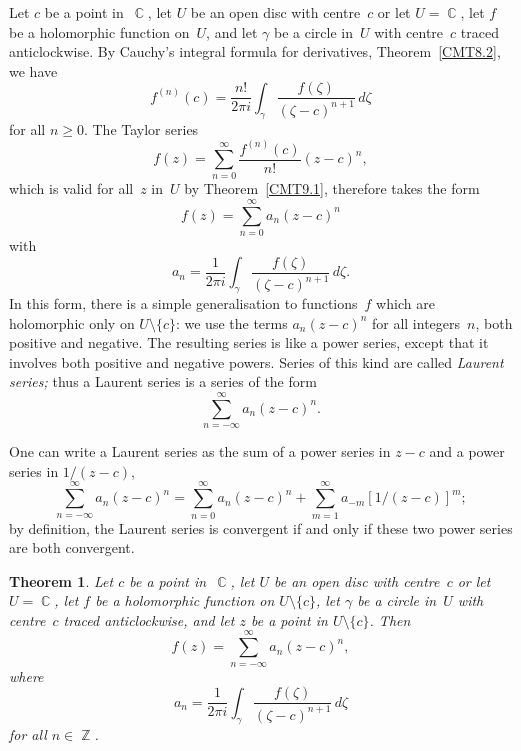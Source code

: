 \documentclass{amsproc}
\newtheorem{theorem}{Theorem}[subsection]
\theoremstyle{definition}
\theoremstyle{remark}
\DeclareMathOperator{\Z}{\mathbb{Z}}
\DeclareMathOperator{\C}{\mathbb{C}}
\numberwithin{equation}{section}
\begin{document}
Let $ c $ be a point in~$ \C $, let $ U $ be an open disc with centre~$ c $ or let $ U = \C $, let $ f $ be a holomorphic function on~$ U $, and let $ \gamma $ be a circle
in~$ U $ with centre~$ c $ traced anticlockwise. By Cauchy's integral formula for derivatives, Theorem~\ref{CMT8.2}, we have
$$
f^{(n)}(c) = \dfrac{n!}{2\pi i} \int_\gamma\dfrac{f(\zeta)}{(\zeta - c)^{n + 1}}\,d\zeta
$$
for all $ n \geq 0 $. The Taylor series
$$
f(z) = \sum_{n = 0}^\infty \dfrac{f^{(n)}(c)}{n!}(z - c)^n,
$$
which is valid for all~$ z $ in~$ U $ by Theorem~\ref{CMT9.1}, therefore takes the form
$$
f(z) = \sum_{n = 0}^\infty a_n(z - c)^n
$$
with
$$
a_n = \dfrac{1}{2\pi i} \int_\gamma\dfrac{f(\zeta)}{(\zeta - c)^{n + 1}}\,d\zeta.
$$
In this form, there is a simple generalisation to functions~$ f $ which are holomorphic only on $ U \setminus\{c\} $: we use the terms $ a_n(z - c)^n $ for all integers~$ n $,
both positive and negative. The resulting series is like a power series, except that it involves both positive and negative powers. Series of this kind are
called \emph{Laurent series;} thus a Laurent series is a series of the form
$$
\sum_{n = -\infty}^\infty a_n(z - c)^n.
$$

One can write a Laurent series as the sum of a power series in $ z - c $ and a power series in $ 1/(z - c) $,
$$
\sum_{n = -\infty}^\infty a_n(z - c)^n = \sum_{n = 0}^\infty a_n(z - c)^n + \sum_{m = 1}^\infty a_{-m}[1/(z - c)]^m;
$$
by definition, the Laurent series is convergent if and only if these two power series are both convergent.

\begin{theorem} \label{CMT10.1}
Let $ c $ be a point in~$ \C $, let $ U $ be an open disc with centre~$ c $ or let $ U = \C $, let $ f $ be a holomorphic function on $ U \setminus \{c\} $, let $ \gamma $ be
a circle in~$ U $ with centre~$ c $ traced anticlockwise, and let $ z $ be a point in $ U \setminus \{c\} $. Then
$$
f(z) = \sum_{n = -\infty}^\infty a_n(z - c)^n,
$$
where
$$
a_n = \dfrac{1}{2\pi i} \int_\gamma \dfrac{f(\zeta)}{(\zeta - c)^{n + 1}}\,d\zeta
$$
for all $ n \in \Z $.
\end{theorem}
\end{document}
